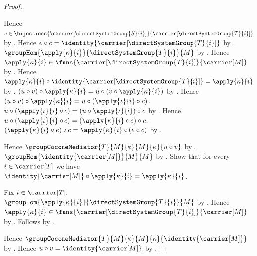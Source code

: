 \begin{proof}
\begin{subproof}
        Hence $e\in\bijections
            {\carrier[\directSystemGroup{S}{i}]}
            {\carrier[\directSystemGroup{T}{i}]}$ by
            .
        Hence $e\circ c
            =\identity{\carrier[\directSystemGroup{T}{i}]}$ by
            .
        $\groupHom{\apply{\kappa}{i}}
            {\directSystemGroup{T}{i}}{M}$ by
            .
        Hence $\apply{\kappa}{i}\in
            \funs{\carrier[\directSystemGroup{T}{i}]}{\carrier[M]}$ by
            .
        Hence $\apply{\kappa}{i}\circ
            \identity{\carrier[\directSystemGroup{T}{i}]}
            =\apply{\kappa}{i}$ by
            .
        $(u\circ v)\circ\apply{\kappa}{i}
            =u\circ(v\circ\apply{\kappa}{i})$ by
            .
        Hence $(u\circ v)\circ\apply{\kappa}{i}
            =u\circ(\apply{\iota}{i}\circ c)$.
        $u\circ(\apply{\iota}{i}\circ c)
            =(u\circ\apply{\iota}{i})\circ c$ by
            .
        Hence $u\circ(\apply{\iota}{i}\circ c)
            =(\apply{\kappa}{i}\circ e)\circ c$.
        $(\apply{\kappa}{i}\circ e)\circ c
            =\apply{\kappa}{i}\circ(e\circ c)$ by
            .
    \end{subproof}
    Hence $\groupCoconeMediator
        {T}{M}{\kappa}{M}{\kappa}{u\circ v}$ by
        .
    $\groupHom{\identity{\carrier[M]}}{M}{M}$ by
        .
    Show that for every $i\in\carrier[T]$ we have
        $\identity{\carrier[M]}\circ\apply{\kappa}{i}
            =\apply{\kappa}{i}$.
    \begin{subproof}
        Fix $i\in\carrier[T]$.
        $\groupHom{\apply{\kappa}{i}}
            {\directSystemGroup{T}{i}}{M}$ by
            .
        Hence $\apply{\kappa}{i}\in
            \funs{\carrier[\directSystemGroup{T}{i}]}{\carrier[M]}$ by
            .
        Follows by .
    \end{subproof}
    Hence $\groupCoconeMediator
        {T}{M}{\kappa}{M}{\kappa}{\identity{\carrier[M]}}$ by
        .
    Hence $u\circ v=\identity{\carrier[M]}$ by
        .
\end{proof}

